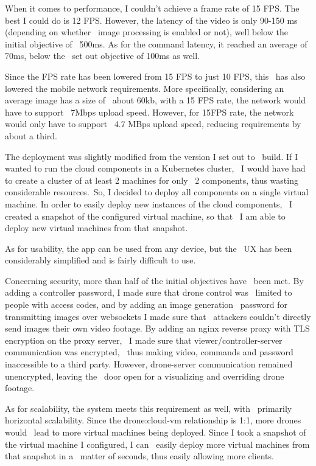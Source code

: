 When it comes to performance, I couldn't achieve a frame rate of 15 FPS.
The best I could do is 12 FPS.
However, the latency of the video is only 90-150 ms (depending on whether \
image processing is enabled or not), well below the initial objective of \
500ms.
As for the command latency, it reached an average of 70ms, below the \
set out objective of 100ms as well.

Since the FPS rate has been lowered from 15 FPS to just 10 FPS, this \
has also lowered the mobile network requirements.
More specifically, considering an average image has a size of \
about 60kb, with a 15 FPS rate, the network would have to support \
7Mbps upload speed.
However, for 15FPS rate, the network would only have to support \
4.7 MBps upload speed, reducing requirements by about a third.

The deployment was slightly modified from the version I set out to \
build.
If I wanted to run the cloud components in a Kubernetes cluster, \
I would have had to create a cluster of at least 2 machines for only \
2 components, thus wasting considerable resources.\
So, I decided to deploy all components on a single virtual machine.
In order to easily deploy new instances of the cloud components, \
I created a snapshot of the configured virtual machine, so that \
I am able to deploy new virtual machines from that snapshot.

As for usability, the app can be used from any device, but the \
UX has been considerably simplified and is fairly difficult to use.

Concerning security, more than half of the initial objectives have \
been met.
By adding a controller password, I made sure that drone control was \
limited to people with access codes, and by adding an image generation \
password for transmitting images over websockets I made sure that \
attackers couldn't directly send images their own video footage.
By adding an nginx reverse proxy with TLS encryption on the proxy server, \
I made sure that viewer/controller-server communication was encrypted, \
thus making video, commands and password inaccessible to a third party.
However, drone-server communication remained unencrypted, leaving the \
door open for a visualizing and overriding drone footage.


As for scalability, the system meets this requirement as well, with \
primarily horizontal scalability.
Since the drone:cloud-vm relationship is 1:1, more drones would \
lead to more virtual machines being deployed.
Since I took a snapshot of the virtual machine I configured, I can \
easily deploy more virtual machines from that snapshot in a \
matter of seconds, thus easily allowing more clients.


